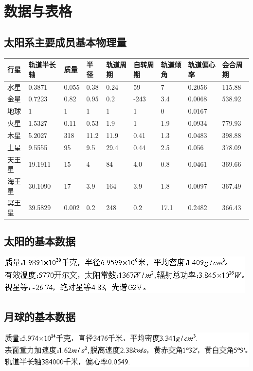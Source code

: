 \chapter{数据与表格}
\section{太阳系主要成员基本物理量}
\begin{center}
	\begin{tabular}{|l|l|l|l|l|l|l|l|l|}
		\hline
		行星 & 轨道半长轴& 质量 & 半径 &轨道周期 & 自转周期 & 轨道倾角 & 轨道偏心率 & 会合周期 \\ \hline
		水星 & 0.3871 & 0.055 & 0.38 & 0.24 & 59 & 7 & 0.2056 & 115.88 \\ \hline
		金星  & 0.7223 & 0.82 & 0.95 & 0.2 & -243 & 3.4 & 0.0068 & 538.92 \\ \hline
		地球  & 1 & 1 & 1 & 1 & 1 & 0 & 0.0167 & ~ \\ \hline
		火星  & 1.5327 & 0.11 & 0.53 & 1.9 & 1 & 1.9 & 0.0934 & 779.93 \\ \hline
		木星  & 5.2027 & 318 & 11.2 & 11.9 & 0.41 & 1.3 & 0.0483 & 398.88 \\ \hline
		土星 & 9.5555 & 95 & 9.5 & 29.4 & 0.44 & 2.5 & 0.056 & 378.09 \\ \hline
		天王星  & 19.1911 & 15 & 4 & 84 & 4.0 & 0.8 & 0.0461 & 369.66 \\ \hline
		海王星  & 30.1090 & 17 & 3.9 & 164 & 3.9 & 1.8 & 0.0097 & 367.49 \\ \hline
		冥王星  & 39.5829 & 0.002 & 0.2 & 248 & 0.2 & 17.1 & 0.2482 & 366.43 \\ \hline
	\end{tabular}
\end{center}
\section{太阳的基本数据}
\includegraphics{const_sun.jpg}
\section{月球的基本数据}
\includegraphics{const_moon.png}
